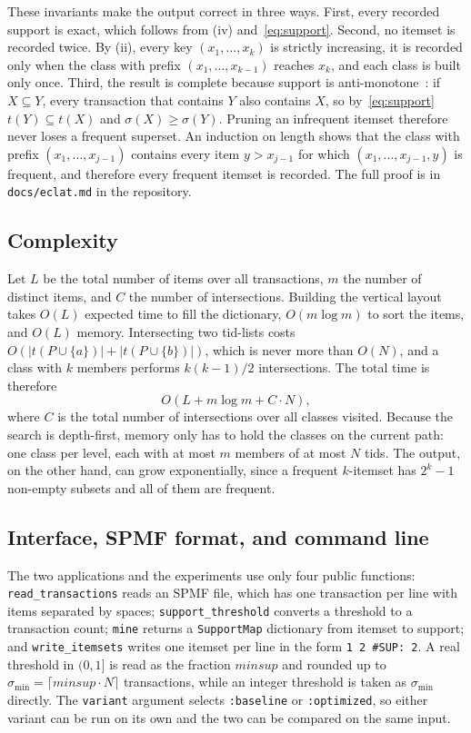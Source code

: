 These invariants make the output correct in three ways. First, every recorded support is
exact, which follows from (iv) and~\eqref{eq:support}. Second, no itemset is recorded
twice. By (ii), every key $(x_1, \dots, x_k)$ is strictly increasing, it is recorded only
when the class with prefix $(x_1, \dots, x_{k-1})$ reaches $x_k$, and each class is built
only once. Third, the result is complete because support is
anti-monotone~\cite{agrawal1994}: if $X \subseteq Y$, every transaction that contains $Y$
also contains $X$, so by~\eqref{eq:support} $t(Y) \subseteq t(X)$ and
$\sigma(X) \ge \sigma(Y)$. Pruning an infrequent itemset therefore never loses a frequent
superset. An induction on length shows that the class with prefix
$(x_1, \dots, x_{j-1})$ contains every item $y > x_{j-1}$ for which
$(x_1, \dots, x_{j-1}, y)$ is frequent, and therefore every frequent itemset is recorded.
The full proof is in \texttt{docs/eclat.md} in the repository.

\subsection{Complexity}
Let $L$ be the total number of items over all transactions, $m$ the number of distinct
items, and $C$ the number of intersections. Building the vertical layout takes $O(L)$
expected time to fill the dictionary, $O(m \log m)$ to sort the items, and $O(L)$ memory.
Intersecting two tid-lists costs $O(|t(P \cup \{a\})| + |t(P \cup \{b\})|)$, which is
never more than $O(N)$, and a class with $k$ members performs $k(k-1)/2$ intersections.
The total time is therefore
\begin{equation}
  O(L + m \log m + C \cdot N),
  \label{eq:cost}
\end{equation}
where $C$ is the total number of intersections over all classes visited. Because the
search is depth-first, memory only has to hold the classes on the current path: one class
per level, each with at most $m$ members of at most $N$ tids. The output, on the other
hand, can grow exponentially, since a frequent $k$-itemset has $2^k - 1$ non-empty
subsets and all of them are frequent.

\subsection{Interface, SPMF format, and command line}
The two applications and the experiments use only four public functions:
\texttt{read\_transactions} reads an SPMF file, which has one transaction per line with
items separated by spaces; \texttt{support\_threshold} converts a threshold to a
transaction count; \texttt{mine} returns a \texttt{SupportMap} dictionary from itemset to
support; and \texttt{write\_itemsets} writes one itemset per line in the form
\texttt{1 2 \#SUP: 2}. A real threshold in $(0, 1]$ is read as the fraction
$\mathit{minsup}$ and rounded up to $\sigma_{\min} = \lceil \mathit{minsup} \cdot N \rceil$
transactions, while an integer threshold is taken as $\sigma_{\min}$ directly. The
\texttt{variant} argument selects \texttt{:baseline} or \texttt{:optimized}, so either
variant can be run on its own and the two can be compared on the same input.

